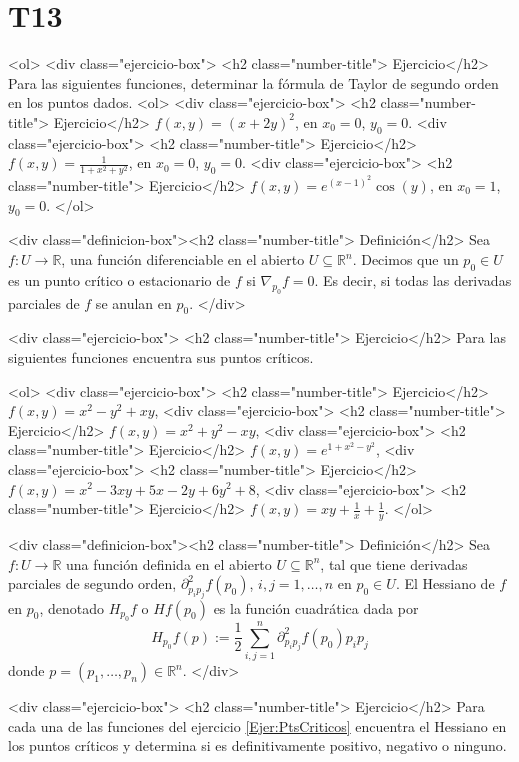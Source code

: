 \documentclass{article}
\theoremstyle{definition}
\begin{document}
  \section*{T13 }
  <ol>
  <div class="ejercicio-box"> <h2 class="number-title"> Ejercicio</h2> Para las siguientes funciones, determinar la fórmula
    de Taylor de segundo orden en los puntos dados.
    <ol>
    <div class="ejercicio-box"> <h2 class="number-title"> Ejercicio</h2> $f(x,y)=(x+2y)^2$, en $x_0=0$, $y_0=0$.
    <div class="ejercicio-box"> <h2 class="number-title"> Ejercicio</h2> $f(x,y)=\frac{1}{1+x^2+y^2}$, en $x_0=0$, $y_0=0$.
    <div class="ejercicio-box"> <h2 class="number-title"> Ejercicio</h2> $f(x,y)=e^{(x-1)^2}\cos(y)$, en  $x_0=1$, $y_0=0$.
    </ol>

    <div class="definicion-box"><h2 class="number-title">  Definición</h2>
      Sea $f:U  \to \mathbb{R}$,
      una función diferenciable en el abierto $U\subseteq \mathbb{R}^n$.
      Decimos
      que un $p_0\in U$ es un punto crítico
      o estacionario de $f$ si $\nabla_{p_0}f=0$. Es decir, si todas
      las derivadas parciales de $f$ se anulan en $p_0$.
    </div>
    
    
  <div class="ejercicio-box"> <h2 class="number-title"> Ejercicio</h2>\label{Ejer:PtsCriticos}
    Para las siguientes funciones  encuentra sus puntos críticos.
  
 
    <ol>
    <div class="ejercicio-box"> <h2 class="number-title"> Ejercicio</h2> $f(x,y)=x^2-y^2+xy$,
    <div class="ejercicio-box"> <h2 class="number-title"> Ejercicio</h2> $f(x,y)=x^2+y^2-xy$,
    <div class="ejercicio-box"> <h2 class="number-title"> Ejercicio</h2> $f(x,y)=e^{1+x^2-y^2}$,
    <div class="ejercicio-box"> <h2 class="number-title"> Ejercicio</h2> $f(x,y)=x^2-3xy+5x-2y+6y^2+8$,
    <div class="ejercicio-box"> <h2 class="number-title"> Ejercicio</h2> $f(x,y)=xy+\frac{1}{x}+\frac{1}{y}$.
    </ol>
    

    <div class="definicion-box"><h2 class="number-title">  Definición</h2>
      Sea $f:U \to \mathbb{R}$ una función definida en el
      abierto $U\subseteq \mathbb{R}^n$, tal que tiene derivadas
      parciales de segundo orden, $\partial^2_{p_i p_j}f(p_0)$, $i,j=1,\dots, n$
      en  $p_0\in U$. El Hessiano de $f$ en $p_0$, denotado $H_{p_0}f$
      o $Hf(p_0)$ es la función cuadrática dada por
      $$
      H_{p_0}f(p):=\frac{1}{2}\sum_{i,j=1}^n
      \partial^2_{p_i p_j}f(p_0)p_ip_j
      $$
      donde $p=(p_1,\dots, p_n)\in \mathbb{R}^n$.
      </div>
    
  <div class="ejercicio-box"> <h2 class="number-title"> Ejercicio</h2> Para cada una de las funciones del ejercicio  \ref{Ejer:PtsCriticos}
    encuentra el Hessiano en los puntos críticos y determina si es
    definitivamente positivo, negativo o ninguno.
\end{document}
